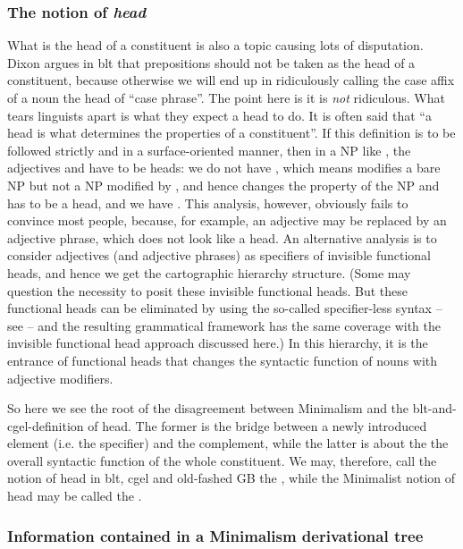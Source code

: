 \documentclass[../main.tex]{subfiles}
\begin{document}
\subsubsection{The notion of \emph{head}}\label{sec:headedness}

What is the head of a constituent is also a topic causing lots of disputation. 
Dixon argues in \ac{blt} that prepositions should not be taken as the head of a constituent,
because otherwise we will end up in ridiculously calling the case affix of a noun the head of ``case phrase''.
The point here is it is \emph{not} ridiculous.
What tears linguists apart is what they expect a head to do. 
It is often said that 
``a head is what determines the properties of a constituent''.
If this definition is to be followed strictly and in a surface-oriented manner,
then in a NP like ,
the adjectives  and  have to be heads:
we do not have ,
which means  modifies a bare NP but not a NP modified by ,
and hence  changes the property of the NP and has to be a head, 
and we have .
This analysis, however, obviously fails to convince most people,
because, for example, an adjective may be replaced by an adjective phrase,
which does not look like a head.
An alternative analysis is to consider adjectives (and adjective phrases) as specifiers of 
invisible functional heads, and hence we get the cartographic hierarchy structure.
(Some may question the necessity to posit these invisible functional heads. 
But these functional heads can be eliminated by using the so-called specifier-less syntax --
see  --
and the resulting grammatical framework has the same coverage 
with the invisible functional head approach discussed here.)
In this hierarchy, 
it is the entrance of functional heads 
that changes the syntactic function of nouns with adjective modifiers.

So here we see the root of the disagreement between Minimalism 
and the \ac{blt}-and-\ac{cgel}-definition of head. 
The former is the bridge between a newly introduced element (i.e. the specifier) and the complement, 
while the latter is about the the overall syntactic function of the whole constituent. 
We may, therefore, call the notion of head in \ac{blt}, \ac{cgel} and old-fashed GB the ,
while the Minimalist notion of head may be called the .

\subsubsection{Information contained in a Minimalism derivational tree}
\end{document}

